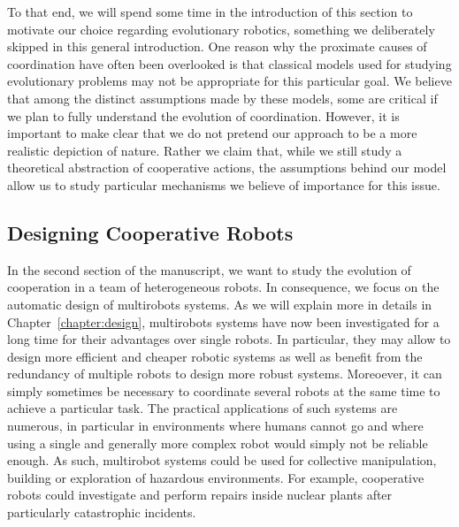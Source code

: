 
    To that end, we will spend some time in the introduction of this section to motivate our choice regarding evolutionary robotics, something we deliberately skipped in this general introduction. One reason why the proximate causes of coordination have often been overlooked is that classical models used for studying evolutionary problems may not be appropriate for this particular goal. We believe that among the distinct assumptions made by these models, some are critical if we plan to fully understand the evolution of coordination. However, it is important to make clear that we do not pretend our approach to be a more realistic depiction of nature. Rather we claim that, while we still study a theoretical abstraction of cooperative actions, the assumptions behind our model allow us to study particular mechanisms we believe of importance for this issue.


  \subsection{Designing Cooperative Robots}

    In the second section of the manuscript, we want to study the evolution of cooperation in a team of heterogeneous robots. In consequence, we focus on the automatic design of multirobots systems. As we will explain more in details in Chapter~\ref{chapter:design}, multirobots systems have now been investigated for a long time for their advantages over single robots. In particular, they may allow to design more efficient and cheaper robotic systems as well as benefit from the redundancy of multiple robots to design more robust systems. Moreoever, it can simply sometimes be necessary to coordinate several robots at the same time to achieve a particular task. The practical applications of such systems are numerous, in particular in environments where humans cannot go and where using a single and generally more complex robot would simply not be reliable enough. As such, multirobot systems could be used for collective manipulation, building or exploration of hazardous environments. For example, cooperative robots could investigate and perform repairs inside nuclear plants after particularly catastrophic incidents.

